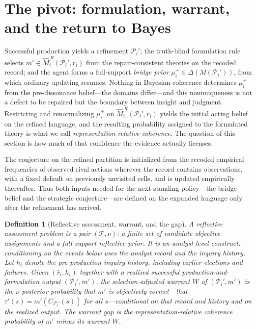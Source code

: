 \documentclass[11pt]{article}
\newtheorem{definition}[assumption]{Definition}
\theoremstyle{definition}
\begin{document}
\section{The pivot: formulation, warrant, and the return to Bayes}
\label{sec:pivot}

Successful production yields a refinement $\mathcal P_i'$; the truth-blind formulation rule selects $m'\in\widehat M_i^{\,R}(\mathcal P_i',\bar r_i)$ from the repair-consistent theories on the recoded record; and the agent forms a full-support \emph{bridge prior} $\mu_i^{+}\in\Delta(M(\mathcal P_i'))$, from which ordinary updating resumes.
Nothing in Bayesian coherence determines $\mu_i^{+}$ from the pre-dissonance belief---the domains differ---and this nonuniqueness is not a defect to be repaired but the boundary between insight and judgment.
Restricting and renormalizing $\mu_i^{+}$ on $\widehat M_i^{\,R}(\mathcal P_i',\bar r_i)$ yields the initial acting belief on the refined language, and the resulting probability assigned to the formulated theory is what we call \emph{representation-relative coherence}.
The question of this section is how much of that confidence the evidence actually licenses.

The conjecture on the refined partition is initialized from the recoded empirical frequencies of observed rival actions wherever the record contains observations, with a fixed default on previously unvisited cells, and is updated empirically thereafter.
Thus both inputs needed for the next standing policy---the bridge belief and the strategic conjecture---are defined on the expanded language only after the refinement has arrived.

\begin{definition}[Reflective assessment, warrant, and the gap]
\label{def:warrant}
A reflective assessment problem is a pair $(\mathcal T,\nu)$: a finite set of candidate objective assignments and a full-support reflective prior.
It is an \emph{analyst-level} construct: conditioning on the events below uses the analyst record and the inquiry history.
Let $h_i$ denote the pre-production inquiry history, including earlier elections and failures.
Given $(\bar r_i,h_i)$ together with a realized successful production-and-formulation output $(\mathcal P_i',m')$, the \emph{selection-adjusted warrant} $W$ of $(\mathcal P_i',m')$ is the $\nu$-posterior probability that $m'$ is objectively correct---that $\tau'(s)=m'(C_{\mathcal P_i'}(s))$ for all $s$---conditional on that record \emph{and} history and on the realized output.
The \emph{warrant gap} is the representation-relative coherence probability of $m'$ minus its warrant $W$.
\end{definition}
\end{document}
